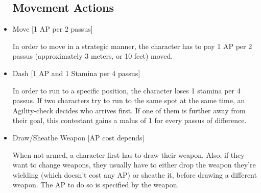 \begin{itemize}
\subsection{Movement Actions}

\item Move [1 AP per 2 passus]

In order to move in a strategic manner, the character has to pay 1 AP per 2 passus (approximately 3 meters, or 10 feet) moved. 



\item Dash [1 AP and 1 Stamina per 4 passus]

In order to run to a specific position, the character loses 1 stamina per 4 passus. If two characters try to run to the same spot at the same time, an Agility-check decides who arrives first. If one of them is further away from their goal, this contestant gains a malus of 1 for every passus of difference.


\item Draw/Sheathe Weapon [AP cost depends]

When not armed, a character first has to draw their weapon. Also, if they want to change weapons, they usually have to either drop the weapon they're wielding (which doesn't cost any AP) or sheathe it, before drawing a different weapon. The AP to do so is specified by the weapon.


\end{itemize}